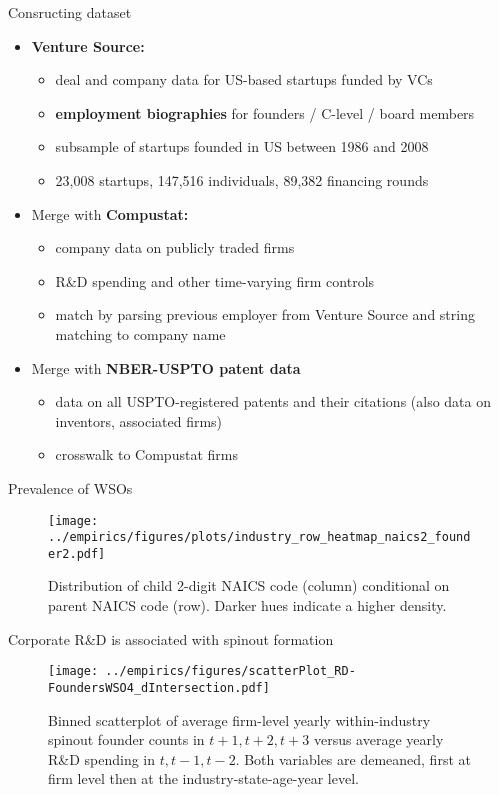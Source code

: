 \documentclass[english,usenames,dvipsnames]{beamer}
\begin{document}
\begin{frame}{Consructing dataset}
	\begin{itemize}
		\item<+-> \alert{\textbf{Venture Source:}} 
		\begin{itemize}
			\item deal and company data for US-based startups funded by VCs
			\item \alert{\textbf{employment biographies}} for founders / C-level / board members
			\item subsample of startups founded in US between 1986 and 2008
			\item 23,008 startups, 147,516 individuals, 89,382 financing rounds
		\end{itemize}
		\medskip
		\item<+-> Merge with \alert{\textbf{Compustat:}}
		\begin{itemize}
			\item company data on publicly traded firms 
			\item R\&D spending and other time-varying firm controls
			\item match by parsing previous employer from Venture Source and string matching to company name
		\end{itemize}
		\medskip
		\item<+-> Merge with \alert{\textbf{NBER-USPTO patent data}}
		\begin{itemize}
			\item data on all USPTO-registered patents and their citations (also data on inventors, associated firms)
			\item crosswalk to Compustat firms
		\end{itemize}
	\end{itemize}
\end{frame}

\begin{frame}{Prevalence of WSOs}
	\begin{figure}[]
		\centering
		\texttt{[image: ../empirics/figures/plots/industry\_row\_heatmap\_naics2\_founder2.pdf]}
		\caption{Distribution of child 2-digit NAICS code (column) conditional on parent NAICS code (row). Darker hues indicate a higher density.}
		\label{figure:industry_row_heatmap_naics2_founder2}
	\end{figure}
\end{frame}

\begin{frame}{Corporate R\&D is associated with spinout formation}
	
	\begin{figure}[!htb]
		\centering
		\texttt{[image: ../empirics/figures/scatterPlot\_RD-FoundersWSO4\_dIntersection.pdf]}
		\caption{\footnotesize Binned scatterplot of average firm-level yearly within-industry spinout founder counts in $t+1,t+2,t+3$ versus average yearly R\&D spending in $t,t-1,t-2$. Both variables are demeaned, first at firm level then at the industry-state-age-year level.}
	\end{figure}
\end{frame}
\end{document}
